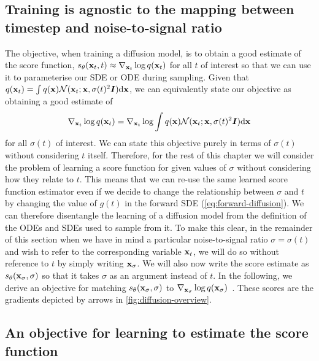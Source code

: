 \subsection{Training is agnostic to the mapping between timestep and noise-to-signal ratio}
The objective, when training a diffusion model, is to obtain a good estimate of the score function, $s_\theta({\mathbf{x}}_t, t) \approx \nabla_{{\mathbf{x}}_t} \log q({\mathbf{x}}_t)$ for all $t$ of interest so that we can use it to parameterise our SDE or ODE during sampling. Given that $q({\mathbf{x}}_t) = \int q({\mathbf{x}}) {\mathcal{N}}({\mathbf{x}}_t; {\mathbf{x}}, \sigma(t)^2{\bm{I}}) \mathrm{d}{\mathbf{x}}$, we can equivalently state our objective as obtaining a good estimate of 
\begin{equation}
\nabla_{{\mathbf{x}}_t} \log q({\mathbf{x}}_t) = \nabla_{{\mathbf{x}}_t} \log \int q({\mathbf{x}}) {\mathcal{N}}({\mathbf{x}}_t; {\mathbf{x}}, \sigma(t)^2{\bm{I}}) \mathrm{d}{\mathbf{x}}
\end{equation}
for all $\sigma(t)$ of interest. We can state this objective purely in terms of $\sigma(t)$ without considering $t$ itself. Therefore, for the rest of this chapter we will consider the problem of learning a score function for given values of $\sigma$ without considering how they relate to $t$. This means that we can re-use the same learned score function estimator even if we decide to change the relationship between $\sigma$ and $t$ by changing the value of $g(t)$ in the forward SDE (\cref{eq:forward-diffusion}). We can therefore disentangle the learning of a diffusion model from the definition of the ODEs and SDEs used to sample from it. To make this clear, in the remainder of this section when we have in mind a particular noise-to-signal ratio $\sigma=\sigma(t)$ and wish to refer to the corresponding variable ${\mathbf{x}}_t$, we will do so without reference to $t$ by simply writing ${\mathbf{x}}_\sigma$. We will also now write the score estimate as $s_\theta({\mathbf{x}}_\sigma, \sigma)$ so that it takes $\sigma$ as an argument instead of $t$. In the following, we derive an objective for matching $s_\theta({\mathbf{x}}_\sigma, \sigma)$ to $\nabla_{{\mathbf{x}}_\sigma} \log q({\mathbf{x}}_\sigma)$~\citep{vincent2011connection,song2019generative}. These scores are the gradients depicted by arrows in \cref{fig:diffusion-overview}.

\subsection{An objective for learning to estimate the score function} \label{sec:score-function-training-objective}

